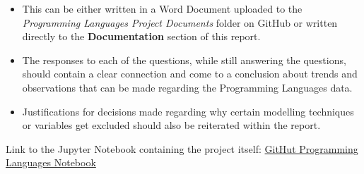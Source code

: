 \documentclass{article}
\theoremstyle{theorem}
\theoremstyle{definition}
\theoremstyle{remark}
\begin{document}
\begin{enumerate}
    \begin{itemize}
        \item This can be either written in a Word Document uploaded to the \textit{Programming Languages Project Documents} folder on GitHub or written directly to the \textbf{Documentation} section of this report.
        \item The responses to each of the questions, while still answering the questions, should contain a clear connection and come to a conclusion about trends and observations that can be made regarding the Programming Languages data.
        \item Justifications for decisions made regarding why certain modelling techniques or variables get excluded should also be reiterated within the report.
    \end{itemize}
\end{enumerate}
Link to the Jupyter Notebook containing the project itself: \href{https://colab.research.google.com/drive/1GuQKes41aCcwipScQs1ERPh6Ch4_szIW?usp=sharing}{GitHut Programming Languages Notebook}
\end{document}
